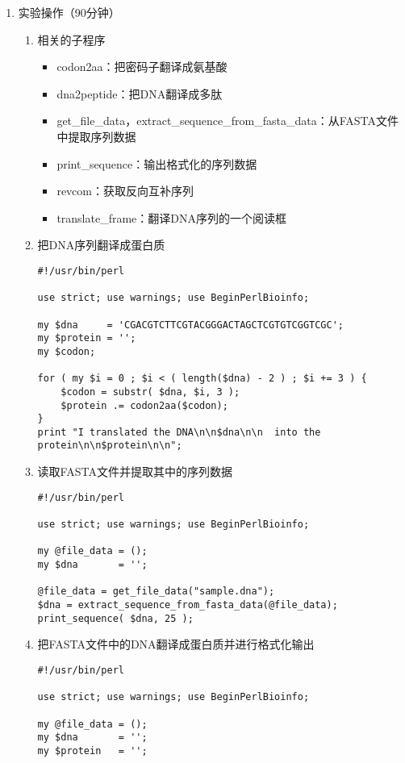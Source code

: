 \documentclass{TIJMUjiaoanSY}
\begin{document}
\firstTail

\newpage
\otherHeader

\begin{enumerate}
  \item 实验操作（90分钟）
    \begin{enumerate}
      \item 相关的子程序
	\begin{itemize}
	  \item codon2aa：把密码子翻译成氨基酸
	  \item dna2peptide：把DNA翻译成多肽
	  \item get\_file\_data，extract\_sequence\_from\_fasta\_data：从FASTA文件中提取序列数据
	  \item print\_sequence：输出格式化的序列数据
	  \item revcom：获取反向互补序列
	  \item translate\_frame：翻译DNA序列的一个阅读框
	\end{itemize}
      \item 把DNA序列翻译成蛋白质
\begin{verbatim}
#!/usr/bin/perl

use strict; use warnings; use BeginPerlBioinfo;

my $dna     = 'CGACGTCTTCGTACGGGACTAGCTCGTGTCGGTCGC';
my $protein = '';
my $codon;

for ( my $i = 0 ; $i < ( length($dna) - 2 ) ; $i += 3 ) {
    $codon = substr( $dna, $i, 3 );
    $protein .= codon2aa($codon);
}
print "I translated the DNA\n\n$dna\n\n  into the protein\n\n$protein\n\n";
\end{verbatim}
      \item 读取FASTA文件并提取其中的序列数据
\begin{verbatim}
#!/usr/bin/perl

use strict; use warnings; use BeginPerlBioinfo;

my @file_data = ();
my $dna       = '';

@file_data = get_file_data("sample.dna");
$dna = extract_sequence_from_fasta_data(@file_data);
print_sequence( $dna, 25 );
\end{verbatim}
      \item 把FASTA文件中的DNA翻译成蛋白质并进行格式化输出
\begin{verbatim}
#!/usr/bin/perl

use strict; use warnings; use BeginPerlBioinfo;

my @file_data = ();
my $dna       = '';
my $protein   = '';


\end{verbatim}
\end{enumerate}
\end{enumerate}
\end{document}
